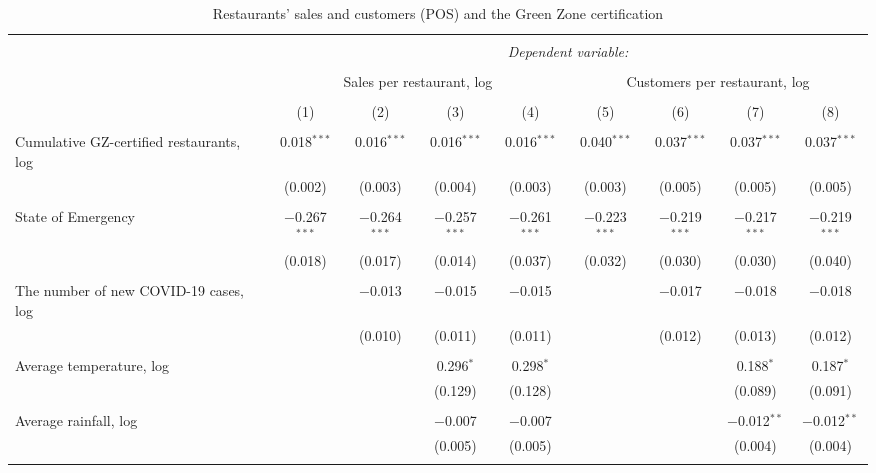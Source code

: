 
\begin{table}[!htbp] \centering 
  \caption{Restaurants' sales and customers (POS) and the Green Zone certification} 
  \label{} 
\begin{tabular}{@{\extracolsep{-15pt}}lcccccccc} 
\\[-1.8ex]\hline 
\hline \\[-1.8ex] 
 & \multicolumn{8}{c}{\textit{Dependent variable:}} \\ 
\cline{2-9} 
\\[-1.8ex] & \multicolumn{4}{c}{Sales per restaurant, log} & \multicolumn{4}{c}{Customers per restaurant, log} \\ 
\\[-1.8ex] & (1) & (2) & (3) & (4) & (5) & (6) & (7) & (8)\\ 
\hline \\[-1.8ex] 
 Cumulative GZ-certified restaurants, log & 0.018$^{***}$ & 0.016$^{***}$ & 0.016$^{***}$ & 0.016$^{***}$ & 0.040$^{***}$ & 0.037$^{***}$ & 0.037$^{***}$ & 0.037$^{***}$ \\ 
  & (0.002) & (0.003) & (0.004) & (0.003) & (0.003) & (0.005) & (0.005) & (0.005) \\ 
  & & & & & & & & \\ 
 State of Emergency & $-$0.267$^{***}$ & $-$0.264$^{***}$ & $-$0.257$^{***}$ & $-$0.261$^{***}$ & $-$0.223$^{***}$ & $-$0.219$^{***}$ & $-$0.217$^{***}$ & $-$0.219$^{***}$ \\ 
  & (0.018) & (0.017) & (0.014) & (0.037) & (0.032) & (0.030) & (0.030) & (0.040) \\ 
  & & & & & & & & \\ 
 The number of new COVID-19 cases, log &  & $-$0.013 & $-$0.015 & $-$0.015 &  & $-$0.017 & $-$0.018 & $-$0.018 \\ 
  &  & (0.010) & (0.011) & (0.011) &  & (0.012) & (0.013) & (0.012) \\ 
  & & & & & & & & \\ 
 Average temperature, log &  &  & 0.296$^{*}$ & 0.298$^{*}$ &  &  & 0.188$^{*}$ & 0.187$^{*}$ \\ 
  &  &  & (0.129) & (0.128) &  &  & (0.089) & (0.091) \\ 
  & & & & & & & & \\ 
 Average rainfall, log &  &  & $-$0.007 & $-$0.007 &  &  & $-$0.012$^{**}$ & $-$0.012$^{**}$ \\ 
  &  &  & (0.005) & (0.005) &  &  & (0.004) & (0.004) \\ 
  & & & & & & & & \\ 

\end{tabular}
\end{table}
